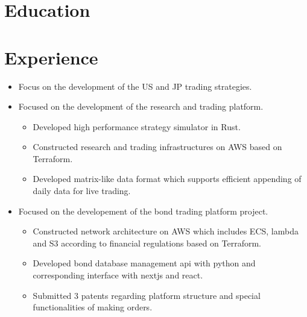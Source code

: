 \documentclass[11pt,a4paper,sans]{moderncv}        %
\begin{document}
\makecvtitle%
\vspace*{-10mm}

\section{Education}
{}

\section{Experience}
{\begin{itemize}%
    \item Focus on the development of the US and JP trading strategies.
\end{itemize}}

{\begin{itemize}%
    \item Focused on the development of the research and trading platform.
        \begin{itemize}%
            \item Developed high performance strategy simulator in Rust.
            \item Constructed research and trading infrastructures on AWS based on Terraform.
            \item Developed matrix-like data format which supports efficient appending of daily data for live trading.
        \end{itemize}
\end{itemize}}

{\begin{itemize}%
    \item Focused on the developement of the bond trading platform project.
        \begin{itemize}%
            \item Constructed network architecture on AWS which includes ECS, lambda and S3 according to financial regulations based on Terraform.
            \item Developed bond database management api with python and corresponding interface with nextjs and react.
            \item Submitted 3 patents regarding platform structure and special functionalities of making orders.
        \end{itemize}
\end{itemize}}
\end{document}
